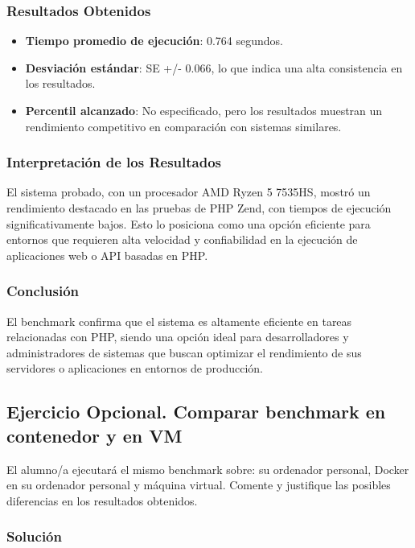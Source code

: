 \subsubsection{Resultados Obtenidos}

\begin{itemize}
    \item \textbf{Tiempo promedio de ejecución}: 0.764 segundos.
    \item \textbf{Desviación estándar}: SE +/- 0.066, lo que indica una alta consistencia en los resultados.
    \item \textbf{Percentil alcanzado}: No especificado, pero los resultados muestran un rendimiento competitivo en comparación con sistemas similares.
\end{itemize}

\subsubsection{Interpretación de los Resultados}

El sistema probado, con un procesador AMD Ryzen 5 7535HS, mostró un rendimiento destacado en las pruebas de PHP Zend, con tiempos de ejecución significativamente bajos. Esto lo posiciona como una opción eficiente para entornos que requieren alta velocidad y confiabilidad en la ejecución de aplicaciones web o API basadas en PHP.

\subsubsection{Conclusión}

El benchmark confirma que el sistema es altamente eficiente en tareas relacionadas con PHP, siendo una opción ideal para desarrolladores y administradores de sistemas que buscan optimizar el rendimiento de sus servidores o aplicaciones en entornos de producción.


\subsection{Ejercicio Opcional. Comparar benchmark en contenedor y en VM}

El alumno/a ejecutará el mismo benchmark sobre: su ordenador personal, Docker en su ordenador personal y máquina virtual. Comente y justifique las posibles diferencias en los resultados obtenidos.

\subsubsection{Solución}

